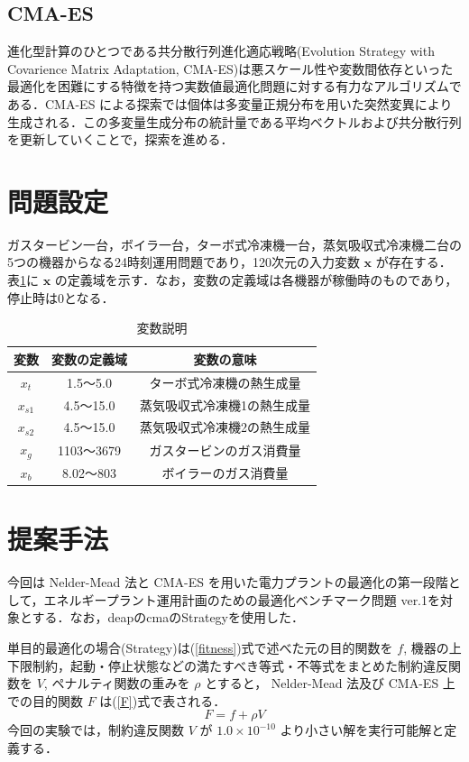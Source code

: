 \documentclass[twocolumn]{jarticle}
\begin{document}
    \subsection{CMA-ES}
    進化型計算のひとつである共分散行列進化適応戦略(Evolution Strategy with Covarience Matrix Adaptation, CMA-ES)\cite{542381}は悪スケール性や変数間依存といった最適化を困難にする特徴を持つ実数値最適化問題に対する有力なアルゴリズムである\cite{akimoto2016}．CMA-ES による探索では個体は多変量正規分布を用いた突然変異により生成される．この多変量生成分布の統計量である平均ベクトルおよび共分散行列を更新していくことで，探索を進める．

\section{問題設定}
ガスタービン一台，ボイラ一台，ターボ式冷凍機一台，蒸気吸収式冷凍機二台の5つの機器からなる24時刻運用問題であり，120次元の入力変数 $\bm{x}$ が存在する．表\ref{explain_variables}に $\bm{x}$ の定義域を示す．なお，変数の定義域は各機器が稼働時のものであり，停止時は0となる．
\begin{table}[hbtp]
    \caption{変数説明}
    \label{explain_variables}
    \centering
    \begin{tabular}{|c|c|c|}
        \hline
        変数 & 変数の定義域 & 変数の意味 \\
        \hline
        $x_t$ & 1.5〜5.0 & ターボ式冷凍機の熱生成量 \\
        $x_{s1}$ & 4.5〜15.0 & 蒸気吸収式冷凍機1の熱生成量 \\
        $x_{s2}$ & 4.5〜15.0 & 蒸気吸収式冷凍機2の熱生成量 \\
        $x_g$ & 1103〜3679 & ガスタービンのガス消費量 \\
        $x_b$ & 8.02〜803 & ボイラーのガス消費量 \\
        \hline
    \end{tabular}
  \end{table}
  
\section{提案手法}
今回は Nelder-Mead 法と CMA-ES を用いた電力プラントの最適化の第一段階として，エネルギープラント運用計画のための最適化ベンチマーク問題 ver.1\cite{denki}を対象とする．なお，deapのcmaのStrategyを使用した．\cite{DEAP_JMLR2012}

単目的最適化の場合(Strategy)は(\ref{fitness})式で述べた元の目的関数を $f$, 機器の上下限制約，起動・停止状態などの満たすべき等式・不等式をまとめた制約違反関数を $V$, ペナルティ関数の重みを $\rho$ とすると， Nelder-Mead 法及び CMA-ES 上での目的関数 $F$ は(\ref{F})式で表される．
\begin{equation}
    \label{F}
    F = f + \rho V
\end{equation}
今回の実験では，制約違反関数 $V$ が $1.0 \times 10^{-10}$ より小さい解を実行可能解と定義する．
\end{document}
